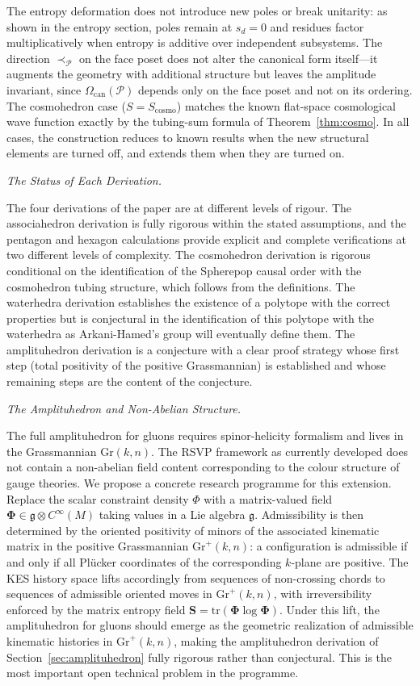 \documentclass[11pt]{article}
\theoremstyle{plain}
\theoremstyle{definition}
\theoremstyle{remark}
\newcommand{\Gr}{\mathrm{Gr}}
\newcommand{\Phif}{\Phi}
\newcommand{\Sf}{S}
\newcommand{\CF}{\Omega_{\mathrm{can}}}
\begin{document}
The entropy deformation does not introduce new poles or break unitarity: as shown in the entropy section, poles remain at $s_d = 0$ and residues factor multiplicatively when entropy is additive over independent subsystems. The direction $\prec_{\mathcal{P}}$ on the face poset does not alter the canonical form itself---it augments the geometry with additional structure but leaves the amplitude invariant, since $\CF(\mathcal{P})$ depends only on the face poset and not on its ordering. The cosmohedron case ($\Sf = \Sf_{\mathrm{cosmo}}$) matches the known flat-space cosmological wave function exactly by the tubing-sum formula of Theorem~\ref{thm:cosmo}. In all cases, the construction reduces to known results when the new structural elements are turned off, and extends them when they are turned on.

\medskip\noindent\textit{The Status of Each Derivation.}

The four derivations of the paper are at different levels of rigour. The associahedron derivation is fully rigorous within the stated assumptions, and the pentagon and hexagon calculations provide explicit and complete verifications at two different levels of complexity. The cosmohedron derivation is rigorous conditional on the identification of the Spherepop causal order with the cosmohedron tubing structure, which follows from the definitions. The waterhedra derivation establishes the existence of a polytope with the correct properties but is conjectural in the identification of this polytope with the waterhedra as Arkani-Hamed's group will eventually define them. The amplituhedron derivation is a conjecture with a clear proof strategy whose first step (total positivity of the positive Grassmannian) is established and whose remaining steps are the content of the conjecture.

\medskip\noindent\textit{The Amplituhedron and Non-Abelian Structure.}

The full amplituhedron for gluons requires spinor-helicity formalism and lives in the Grassmannian $\Gr(k,n)$. The RSVP framework as currently developed does not contain a non-abelian field content corresponding to the colour structure of gauge theories. We propose a concrete research programme for this extension. Replace the scalar constraint density $\Phif$ with a matrix-valued field $\boldsymbol{\Phi} \in \mathfrak{g} \otimes C^\infty(M)$ taking values in a Lie algebra $\mathfrak{g}$. Admissibility is then determined by the oriented positivity of minors of the associated kinematic matrix in the positive Grassmannian $\mathrm{Gr}^+(k,n)$: a configuration is admissible if and only if all Pl\"{u}cker coordinates of the corresponding $k$-plane are positive. The KES history space lifts accordingly from sequences of non-crossing chords to sequences of admissible oriented moves in $\mathrm{Gr}^+(k,n)$, with irreversibility enforced by the matrix entropy field $\boldsymbol{S} = \mathrm{tr}(\boldsymbol{\Phi} \log \boldsymbol{\Phi})$. Under this lift, the amplituhedron for gluons should emerge as the geometric realization of admissible kinematic histories in $\mathrm{Gr}^+(k,n)$, making the amplituhedron derivation of Section~\ref{sec:amplituhedron} fully rigorous rather than conjectural. This is the most important open technical problem in the programme.
\end{document}
